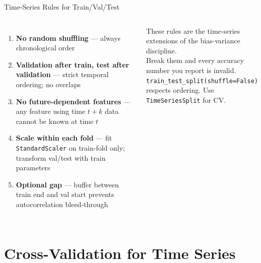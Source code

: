 \documentclass[aspectratio=169, 11pt]{beamer}
\begin{document}
\begin{frame}{Time-Series Rules for Train/Val/Test}
  \begin{columns}[T]
      \begin{enumerate}\small
        \item \textbf{No random shuffling} --- always chronological order
        \item \textbf{Validation after train, test after validation} ---
              strict temporal ordering; no overlaps
        \item \textbf{No future-dependent features} --- any feature using
              time $t+k$ data cannot be known at time $t$
        \item \textbf{Scale within each fold} --- fit
              \texttt{StandardScaler} on train-fold only;
              transform val/test with train parameters
        \item \textbf{Optional gap} --- buffer between train end
              and val start prevents autocorrelation bleed-through
      \end{enumerate}
      \begin{keybox}
        {\small These rules are the time-series extensions
        of the bias-variance discipline.\\[3pt]
        Break them and every accuracy number
        you report is invalid.\\[3pt]
        \texttt{train\_test\_split(shuffle=False)}
        respects ordering.
        Use \texttt{TimeSeriesSplit} for CV.}
      \end{keybox}
  \end{columns}
\end{frame}

\section{Cross-Validation for Time Series}

\end{document}
